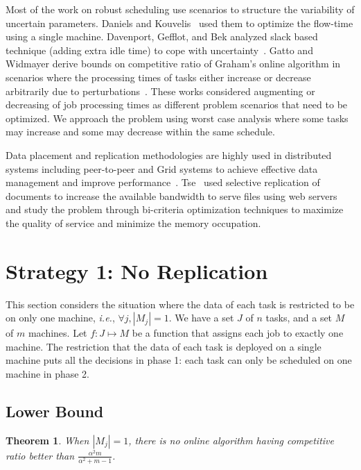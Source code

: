 \documentclass[10pt, conference, compsocconf]{IEEEtran}
\newtheorem{theorem}{Theorem}
\begin{document}
Most of the work on robust scheduling use scenarios to structure
the variability of uncertain parameters. Daniels and
Kouvelis~\cite{citeulike:8334169} used them to optimize the flow-time
using a single machine. Davenport, Gefflot, and Bek analyzed slack
based technique (adding extra idle time) to cope with
uncertainty~\cite{Davenport_slack-basedtechniques}. Gatto and Widmayer
derive bounds on competitive ratio of Graham’s online algorithm in
scenarios where the processing times of tasks either increase or decrease
arbitrarily due to perturbations~\cite{Gatto07}.  These works
considered augmenting or decreasing of job processing times as
different problem scenarios that need to be optimized. We 
approach the problem using worst case analysis where some tasks may
increase and some may decrease within the same schedule.
  
Data placement and replication methodologies are highly used in
distributed systems including peer-to-peer and Grid systems to achieve
effective data management and improve
performance~\cite{Cirne2007213,Abawajy,4215379}. Tse~\cite{DBLP:journals/tc/Tse12}
used selective replication of documents to increase the available
bandwidth to serve files using web servers and study the problem
through bi-criteria optimization techniques to maximize the quality of
service and minimize the memory occupation.

\section{Strategy 1: No Replication}\label{sec4}


This section considers the situation where the data of each task is
restricted to be on only one machine, {\em i.e.}, $\forall j, |M_j|=1$.  We
have a set $J$ of $n$ tasks, and a set $M$ of $m$ machines.  Let $f :
J \mapsto M$ be a function that assigns each job to exactly one
machine. The restriction that the data of each task is deployed on a
single machine puts all the decisions in phase 1: each task can only be
scheduled on one machine in phase 2.

\subsection{Lower Bound}


\begin{theorem}
\label{th:model1-lb}
  When $|M_j| = 1$, there is no online algorithm having competitive
  ratio better than $\frac{\alpha^{2}m }{\alpha^{2} + m-1}$.
\end{theorem}
 
\end{document}
